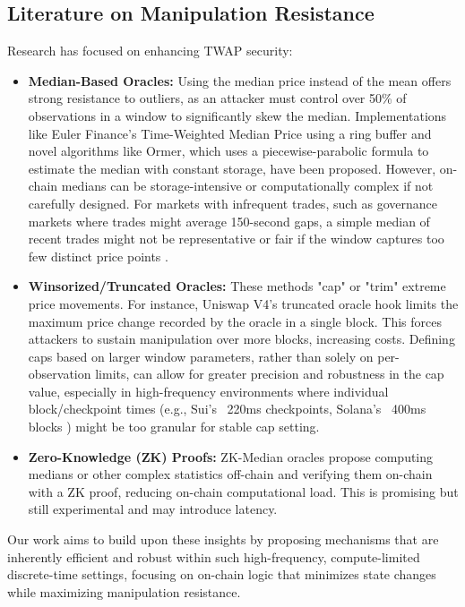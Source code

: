 \documentclass{article}
\begin{document}
\subsection{Literature on Manipulation Resistance}
Research has focused on enhancing TWAP security:
\begin{itemize}
    \item \textbf{Median-Based Oracles:} Using the median price instead of the mean offers strong resistance to outliers, as an attacker must control over 50\% of observations in a window to significantly skew the median. Implementations like Euler Finance's Time-Weighted Median Price using a ring buffer and novel algorithms like Ormer, which uses a piecewise-parabolic formula to estimate the median with constant storage, have been proposed. \cite{omer} However, on-chain medians can be storage-intensive or computationally complex if not carefully designed. For markets with infrequent trades, such as governance markets where trades might average 150-second gaps, a simple median of recent trades might not be representative or fair if the window captures too few distinct price points \cite{trades}.
    \item \textbf{Winsorized/Truncated Oracles:} These methods "cap" or "trim" extreme price movements. For instance, Uniswap V4's truncated oracle hook limits the maximum price change recorded by the oracle in a single block. This forces attackers to sustain manipulation over more blocks, increasing costs. Defining caps based on larger window parameters, rather than solely on per-observation limits, can allow for greater precision and robustness in the cap value, especially in high-frequency environments where individual block/checkpoint times (e.g., Sui's ~220ms checkpoints, Solana's ~400ms blocks \cite{suicheckpoints, solblocks}) might be too granular for stable cap setting.
    \item \textbf{Zero-Knowledge (ZK) Proofs:} ZK-Median oracles propose computing medians or other complex statistics off-chain and verifying them on-chain with a ZK proof, reducing on-chain computational load. This is promising but still experimental and may introduce latency.
\end{itemize}

Our work aims to build upon these insights by proposing mechanisms that are inherently efficient and robust within such high-frequency, compute-limited discrete-time settings, focusing on on-chain logic that minimizes state changes while maximizing manipulation resistance.
\end{document}
